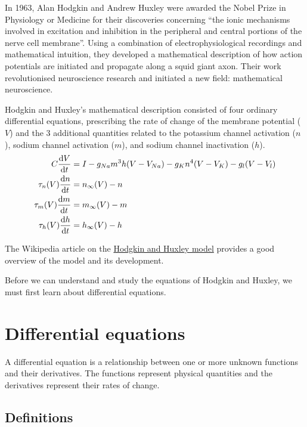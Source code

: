 \documentclass[11pt]{article}
\begin{document}
In 1963, Alan Hodgkin and Andrew Huxley were awarded the Nobel Prize in
Physiology or Medicine for their discoveries concerning ``the ionic
mechanisms involved in excitation and inhibition in the peripheral and
central portions of the nerve cell membrane''. Using a combination of
electrophysiological recordings and mathematical intuition, they
developed a mathematical description of how action potentials are
initiated and propagate along a squid giant axon. Their work
revolutionised neuroscience research and initiated a new field:
mathematical neuroscience.

Hodgkin and Huxley's mathematical description consisted of four ordinary
differential equations, prescribing the rate of change of the membrane
potential (\(V\)) and the 3 additional quantities related to the
potassium channel activation (\(n\)), sodium channel activation (\(m\)),
and sodium channel inactivation (\(h\)).
\begin{align*}C\frac{{\rm d}V}{{\rm d}t} &= I - g_{Na} m^3h (V-V_{Na}) - g_K n^4 (V-V_K) - g_l (V-V_l) \\
\tau_n(V)\frac{{\rm d}n}{{\rm d}t} &= n_{\infty}(V)-n \\
\tau_m(V)\frac{{\rm d}m}{{\rm d}t} &= m_{\infty}(V)-m \\
\tau_h(V)\frac{{\rm d}h}{{\rm d}t} &= h_{\infty}(V)-h \end{align*}

The Wikipedia article on the
\href{https://en.wikipedia.org/wiki/Hodgkin\%E2\%80\%93Huxley_model}{Hodgkin
and Huxley model} provides a good overview of the model and its
development.

Before we can understand and study the equations of Hodgkin and Huxley,
we must first learn about differential equations.

    \hypertarget{differential-equations}{%
\section{Differential equations}\label{differential-equations}}

A differential equation is a relationship between one or more unknown
functions and their derivatives. The functions represent physical
quantities and the derivatives represent their rates of change.

\hypertarget{definitions}{%
\subsection{Definitions}\label{definitions}}
\end{document}

